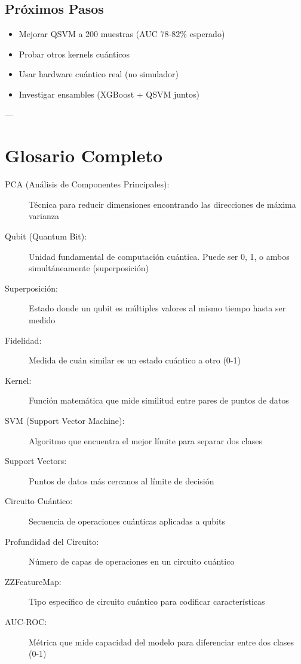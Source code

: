 \documentclass[11pt,a4paper,spanish]{article}
\begin{document}
\subsection{Próximos Pasos}

\begin{itemize}
    \item Mejorar QSVM a 200 muestras (AUC 78-82\% esperado)
    \item Probar otros kernels cuánticos
    \item Usar hardware cuántico real (no simulador)
    \item Investigar ensambles (XGBoost + QSVM juntos)
\end{itemize}

---

\section{Glosario Completo}

\begin{description}
    \item[PCA (Análisis de Componentes Principales):] Técnica para reducir dimensiones encontrando las direcciones de máxima varianza
    
    \item[Qubit (Quantum Bit):] Unidad fundamental de computación cuántica. Puede ser 0, 1, o ambos simultáneamente (superposición)
    
    \item[Superposición:] Estado donde un qubit es múltiples valores al mismo tiempo hasta ser medido
    
    \item[Fidelidad:] Medida de cuán similar es un estado cuántico a otro (0-1)
    
    \item[Kernel:] Función matemática que mide similitud entre pares de puntos de datos
    
    \item[SVM (Support Vector Machine):] Algoritmo que encuentra el mejor límite para separar dos clases
    
    \item[Support Vectors:] Puntos de datos más cercanos al límite de decisión
    
    \item[Circuito Cuántico:] Secuencia de operaciones cuánticas aplicadas a qubits
    
    \item[Profundidad del Circuito:] Número de capas de operaciones en un circuito cuántico
    
    \item[ZZFeatureMap:] Tipo específico de circuito cuántico para codificar características
    
    \item[AUC-ROC:] Métrica que mide capacidad del modelo para diferenciar entre dos clases (0-1)
\end{description}
\end{document}

